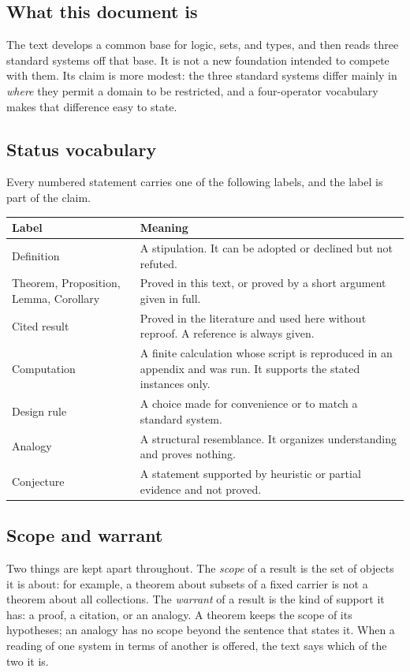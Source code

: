 \documentclass[11pt]{article}
\theoremstyle{definition}
\theoremstyle{plain}
\theoremstyle{remark}
\begin{document}
\subsection{What this document is}

The text develops a common base for logic, sets, and types, and then reads three standard systems off that base. It is not a new foundation intended to compete with them. Its claim is more modest: the three standard systems differ mainly in \emph{where} they permit a domain to be restricted, and a four-operator vocabulary makes that difference easy to state.

\subsection{Status vocabulary}

Every numbered statement carries one of the following labels, and the label is part of the claim.

\begin{center}
\begin{tabular}{@{}p{}p{}@{}}
\toprule
Label & Meaning \\
\midrule
Definition & A stipulation. It can be adopted or declined but not refuted. \\
Theorem, Proposition, Lemma, Corollary & Proved in this text, or proved by a short argument given in full. \\
Cited result & Proved in the literature and used here without reproof. A reference is always given. \\
Computation & A finite calculation whose script is reproduced in an appendix and was run. It supports the stated instances only. \\
Design rule & A choice made for convenience or to match a standard system. \\
Analogy & A structural resemblance. It organizes understanding and proves nothing. \\
Conjecture & A statement supported by heuristic or partial evidence and not proved. \\
\bottomrule
\end{tabular}
\end{center}

\subsection{Scope and warrant}

Two things are kept apart throughout. The \emph{scope} of a result is the set of objects it is about: for example, a theorem about subsets of a fixed carrier is not a theorem about all collections. The \emph{warrant} of a result is the kind of support it has: a proof, a citation, or an analogy. A theorem keeps the scope of its hypotheses; an analogy has no scope beyond the sentence that states it. When a reading of one system in terms of another is offered, the text says which of the two it is.
\end{document}
